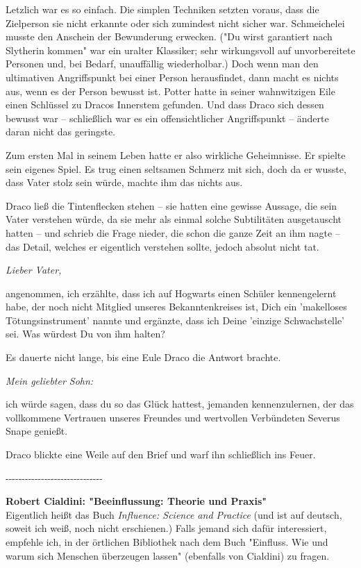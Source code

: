 {Letzlich war es so einfach. Die simplen Techniken setzten voraus, dass die Zielperson sie nicht erkannte oder sich zumindest nicht sicher war. Schmeichelei musste den Anschein der Bewunderung erwecken. ("Du wirst garantiert nach Slytherin kommen" war ein uralter Klassiker; sehr wirkungsvoll auf unvorbereitete Personen und, bei Bedarf, unauffällig wiederholbar.) Doch wenn man den ultimativen Angriffspunkt bei einer Person herausfindet, dann macht es nichts aus, wenn es der Person bewusst ist. Potter hatte in seiner wahnwitzigen Eile einen Schlüssel zu Dracos Innerstem gefunden. Und dass Draco sich dessen bewusst war -- schließlich war es ein offensichtlicher Angriffspunkt -- änderte daran nicht das geringste.

Zum ersten Mal in seinem Leben hatte er also wirkliche Geheimnisse. Er spielte sein eigenes Spiel. Es trug einen seltsamen Schmerz mit sich, doch da er wusste, dass Vater stolz sein würde, machte ihm das nichts aus.

Draco ließ die Tintenflecken stehen -- sie hatten eine gewisse Aussage, die sein Vater verstehen würde, da sie mehr als einmal solche Subtilitäten ausgetauscht hatten -- und schrieb die Frage nieder, die schon die ganze Zeit an ihm nagte -- das Detail, welches er eigentlich verstehen sollte, jedoch absolut nicht tat.

\emph{Lieber Vater,}

angenommen, ich erzählte, dass ich auf Hogwarts einen Schüler kennengelernt habe, der noch nicht Mitglied unseres Bekanntenkreises ist, Dich ein 'makelloses Tötungsinstrument' nannte und ergänzte, dass ich Deine 'einzige Schwachstelle' sei. Was würdest Du von ihm halten?

Es dauerte nicht lange, bis eine Eule Draco die Antwort brachte.

\emph{Mein geliebter Sohn:}

ich würde sagen, dass du so das Glück hattest, jemanden kennenzulernen, der das vollkommene Vertrauen unseres Freundes und wertvollen Verbündeten Severus Snape genießt.

Draco blickte eine Weile auf den Brief und warf ihn schließlich ins Feuer.

-\/-\/-\/-\/-\/-\/-\/-\/-\/-\/-\/-\/-\/-\/-\/-\/-\/-\/-\/-\/-\/-\/-\/-\/-\/-\/-\/-\/-\/-

\textbf{Robert Cialdini: "Beeinflussung: Theorie und Praxis"}\\ Eigentlich heißt das Buch \emph{Influence: Science and Practice} (und ist auf deutsch, soweit ich weiß, noch nicht erschienen.) Falls jemand sich dafür interessiert, empfehle ich, in der örtlichen Bibliothek nach dem Buch "Einfluss. Wie und warum sich Menschen überzeugen lassen" (ebenfalls von Cialdini) zu fragen.

}
